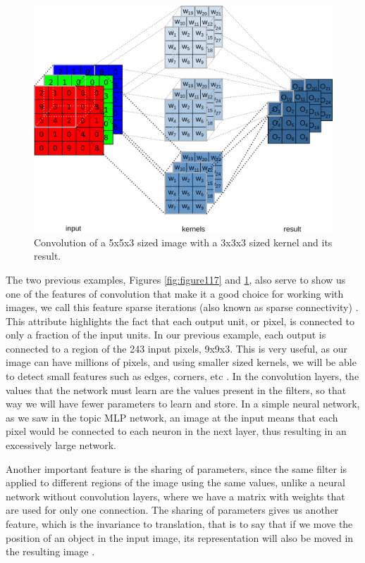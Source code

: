 \begin{figure}
    \centering
    \includegraphics[scale=0.25]{"Part 3 - Learning Systems/Supervised Learning/Deep Learning/images/figure119.png"}
    \caption{Convolution of a 5x5x3 sized image with a 3x3x3 sized kernel and its result.}
    \label{fig:figure119}
\end{figure}

The two previous examples, Figures \ref{fig:figure117} and \ref{fig:figure119}, also serve to show us one of the features of convolution that make it a good choice for working with images, we call this feature sparse iterations (also known as sparse connectivity) \cite{goodfellow2016}. This attribute highlights the fact that each output unit, or pixel, is connected to only a fraction of the input units. In our previous example, each output is connected to a region of the 243 input pixels, 9x9x3. This is very useful, as our image can have millions of pixels, and using smaller sized kernels, we will be able to detect small features such as edges, corners, etc \cite{goodfellow2016}. In the convolution layers, the values that the network must learn are the values present in the filters, so that way we will have fewer parameters to learn and store. In a simple neural network, as we saw in the topic MLP network, an image at the input means that each pixel would be connected to each neuron in the next layer, thus resulting in an excessively large network.

Another important feature is the sharing of parameters, since the same filter is applied to different regions of the image using the same values, unlike a neural network without convolution layers, where we have a matrix with weights that are used for only one connection. The sharing of parameters gives us another feature, which is the invariance to translation, that is to say that if we move the position of an object in the input image, its representation will also be moved in the resulting image \cite{goodfellow2016}.

